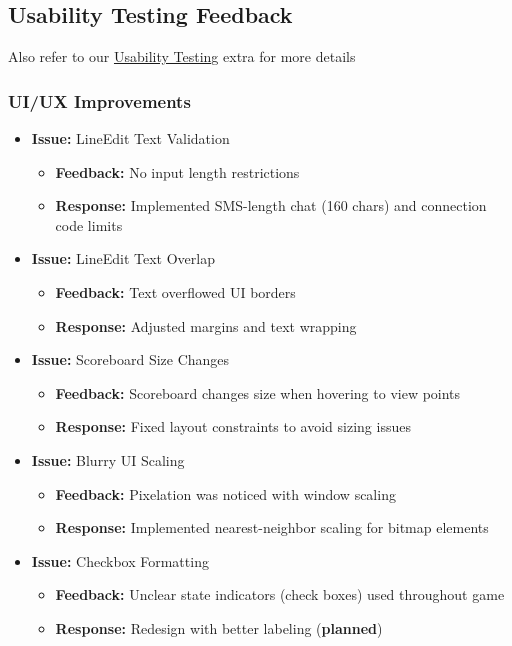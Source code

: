 \documentclass{article}
\begin{document}
\subsection{Usability Testing Feedback}

Also refer to our \href{https://github.com/John-Popovici/duel-of-the-eights/blob/main/docs/Extras/UsabilityTesting/UsabilityTesting.pdf}{Usability Testing} extra for more details

\subsubsection{UI/UX Improvements}
\begin{itemize}
    \item \textbf{Issue:} LineEdit Text Validation
    \begin{itemize}
        \item \textbf{Feedback:} No input length restrictions
        \item \textbf{Response:} Implemented SMS-length chat (160 chars) and connection code limits
    \end{itemize}
    
    \item \textbf{Issue:} LineEdit Text Overlap
    \begin{itemize}
        \item \textbf{Feedback:} Text overflowed UI borders
        \item \textbf{Response:} Adjusted margins and text wrapping
    \end{itemize}
    
    \item \textbf{Issue:} Scoreboard Size Changes
    \begin{itemize}
        \item \textbf{Feedback:} Scoreboard changes size when hovering to view points
        \item \textbf{Response:} Fixed layout constraints to avoid sizing issues
    \end{itemize}
    
    \item \textbf{Issue:} Blurry UI Scaling
    \begin{itemize}
        \item \textbf{Feedback:} Pixelation was noticed with window scaling
        \item \textbf{Response:} Implemented nearest-neighbor scaling for bitmap elements
    \end{itemize}
    
    \item \textbf{Issue:} Checkbox Formatting
    \begin{itemize}
        \item \textbf{Feedback:} Unclear state indicators (check boxes) used throughout game
        \item \textbf{Response:} Redesign with better labeling (\textbf{planned})
    \end{itemize}
\end{itemize}
\end{document}
